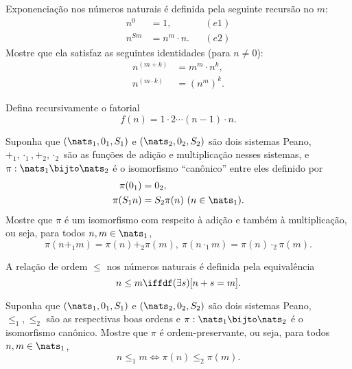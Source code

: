 \begin{exercise}
	Exponenciação nos números naturais é definida pela seguinte recursão no $m$:
	$$
		\begin{aligned}
			n^0 &= 1, && (e1)\\
			n^{Sm} &= n^m \cdot n. && (e2)
		\end{aligned}
	$$
	Mostre que ela satisfaz as seguintes identidades (para $n \neq 0$):
	$$
		\begin{aligned}
			n^{(m + k)} &= m^m \cdot n^k,\\
			n^{(m \cdot k)} &= (n^{m})^k.
		\end{aligned}
	$$
\end{exercise}

\begin{exercise}
	Defina recursivamente o fatorial
	$$
		f(n) = 1 \cdot 2 \cdots (n -1) \cdot n.
	$$
\end{exercise}

\begin{exercise}
	Suponha que $(\nats_1, 0_1, S_1)$ e $(\nats_2, 0_2, S_2)$ são dois sistemas Peano, $+_1, \cdot_1, +_2, \cdot_2$ são as funções de adição e multiplicação nesses sistemas, e $\pi : \nats_1 \bijto \nats_2$ é o isomorfismo ``canônico'' entre eles definido por
	$$
		\begin{aligned}
			\pi(0_1) &= 0_2,\\
			\pi(S_1n) &= S_2\pi(n) \ (n \in \nats_1).
		\end{aligned}
	$$
	Mostre que $\pi$ é um isomorfismo com respeito à adição e também à multiplicação, ou seja, para todos $n, m \in \nats_1$,
	$$
		\pi(n +_1 m) = \pi(n) +_2 \pi(m),\ \pi(n \cdot_1 m) = \pi(n) \cdot_2 \pi(m).
	$$
\end{exercise}

\begin{definition}
	A relação de ordem $\leq$ nos números naturais é definida pela equivalência
	$$
		n \leq m \iffdf (\exists s)[n + s = m].
	$$
\end{definition}

\begin{exercise}
	Suponha que $(\nats_1, 0_1, S_1)$ e $(\nats_2, 0_2, S_2)$ são dois sistemas Peano, $\leq_1, \leq_2$ são as respectivas boas ordens e $\pi : \nats_1 \bijto \nats_2$ é o isomorfismo canônico. Mostre que $\pi$ é ordem-preservante, ou seja, para todos $n, m \in \nats_1$,
	$$
		n \leq_1 m \iff \pi(n) \leq_2 \pi(m).
	$$
\end{exercise}
